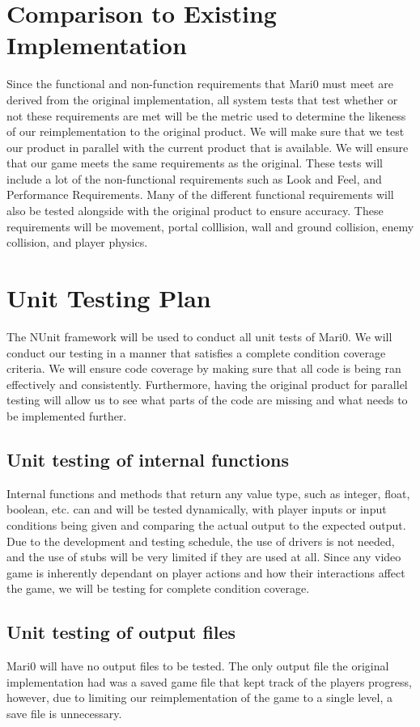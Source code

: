 \documentclass[12pt, titlepage]{article}
\begin{document}
\section{Comparison to Existing Implementation}	
	Since the functional and non-function requirements that Mari0 must meet are derived from the original implementation, all system tests that test whether or not these requirements are met will be the metric used to determine the likeness of our reimplementation to the original product.
	We will make sure that we test our product in parallel with the current product that is available. We will ensure that our game meets the same requirements as the original. These tests will include a lot of the non-functional requirements such as Look and Feel, and Performance Requirements. Many of the different functional requirements will also be tested alongside with the original product to ensure accuracy. These requirements will be movement, portal colllision, wall and ground collision, enemy collision, and player physics.  
\section{Unit Testing Plan}
	The NUnit framework will be used to conduct all unit tests of Mari0. We will conduct our testing in a manner that satisfies a complete condition coverage criteria. We will ensure code coverage by making sure that all code is being ran effectively and consistently. Furthermore, having the original product for parallel testing will allow us to see what parts of the code are missing and what needs to be implemented further.

\subsection{Unit testing of internal functions}
	Internal functions and methods that return any value type, such as integer, float, boolean, etc. can and will be tested dynamically, with player inputs or input conditions being given and comparing the actual output to the expected output. Due to the development and testing schedule, the use of drivers is not needed, and the use of stubs will be very limited if they are used at all. Since any video game is inherently dependant on player actions and how their interactions affect the game, we will be testing for complete condition coverage.
\subsection{Unit testing of output files}		
	Mari0 will have no output files to be tested. The only output file the original implementation had was a saved game file that kept track of the players progress, however, due to limiting our reimplementation of the game to a single level, a save file is unnecessary.

\end{document}
